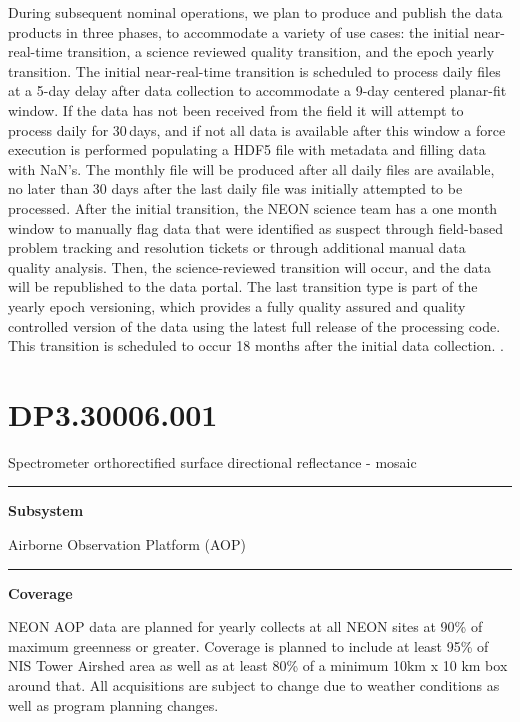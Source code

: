 \documentclass[]{article}
\begin{document}
During subsequent nominal operations, we plan to produce and publish the
data products in three phases, to accommodate a variety of use cases:
the initial near-real-time transition, a science reviewed quality
transition, and the epoch yearly transition. The initial near-real-time
transition is scheduled to process daily files at a 5-day delay after
data collection to accommodate a 9-day centered planar-fit window. If
the data has not been received from the field it will attempt to process
daily for 30\,days, and if not all data is available after this window a
force execution is performed populating a HDF5 file with metadata and
filling data with NaN's. The monthly file will be produced after all
daily files are available, no later than 30 days after the last daily
file was initially attempted to be processed. After the initial
transition, the NEON science team has a one month window to manually
flag data that were identified as suspect through field-based problem
tracking and resolution tickets or through additional manual data
quality analysis. Then, the science-reviewed transition will occur, and
the data will be republished to the data portal. The last transition
type is part of the yearly epoch versioning, which provides a fully
quality assured and quality controlled version of the data using the
latest full release of the processing code. This transition is scheduled
to occur 18 months after the initial data collection. \newpage
.

\section{DP3.30006.001}\label{dp3.30006.001}

Spectrometer orthorectified surface directional reflectance - mosaic

\begin{center}\rule{0.5\linewidth}{\linethickness}\end{center}

\textbf{Subsystem}

Airborne Observation Platform (AOP)

\begin{center}\rule{0.5\linewidth}{\linethickness}\end{center}

\textbf{Coverage}

NEON AOP data are planned for yearly collects at all NEON sites at 90\%
of maximum greenness or greater. Coverage is planned to include at least
95\% of NIS Tower Airshed area as well as at least 80\% of a minimum
10km x 10 km box around that. All acquisitions are subject to change due
to weather conditions as well as program planning changes.
\end{document}
